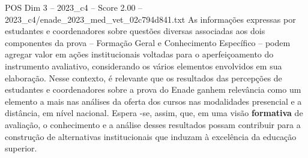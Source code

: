 \begin{textsample}{POS Dim 3 – 2023\_c4 – Score 2.00 – 2023\_c4/enade\_2023\_med\_vet\_02c794d841.txt}
As informações expressas por estudantes e coordenadores sobre questões diversas associadas aos dois componentes da prova – Formação Geral e Conhecimento Específico – podem agregar valor em ações institucionais voltadas para o aperfeiçoamento do instrumento avaliativo, considerando os vários elementos envolvidos em sua elaboração.
Nesse contexto, é relevante que os resultados das percepções de estudantes e coordenadores sobre a prova do Enade ganhem relevância como um elemento a mais nas análises da oferta dos cursos nas modalidades presencial e a distância, em nível nacional.
Espera -se, assim, que, em uma visão \textbf{formativa} de avaliação, o conhecimento e a análise desses resultados possam contribuir para a construção de alternativas institucionais que induzam à excelência da educação superior.

\end{textsample}
